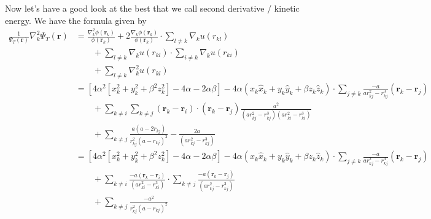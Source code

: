 \documentclass[%
oneside,                 %
final,                   %
10pt]{article}
\begin{document}
Now let's have a good look at the best that we call second derivative / kinetic energy. 
We have the formula given by
\begin{align*}
\frac{1}{\Psi_T(\mathbf{r})}\nabla_k^2\Psi_T(\mathbf{r}) &=
   \frac{\nabla_k^2\phi(\mathbf{r}_k)}{\phi(\mathbf{r}_k)}
   + 2\frac{\nabla_k\phi(\mathbf{r}_k)}{\phi(\mathbf{r}_k)}\cdot 
   \sum_{l\ne k}\nabla_k u(r_{kl})
   \\
   &\qquad
   + \sum_{l\ne k}\nabla_k u(r_{kl}) \cdot \sum_{i\ne k}\nabla_k u(r_{ki})
   \\
   &\qquad
   + \sum_{l\ne k}\nabla_k^2 u(r_{kl})
   \\
   &=\left[ 4\alpha^2\left[x_k^2+y_k^2+\beta^2z_k^2\right]-4\alpha-2\alpha\beta\right]-4\alpha(x_k \hat{x}_k+y_k \hat{y}_k+\beta z_k \hat{z}_k)\cdot \sum_{j\ne k}\frac{-a}{ar^2_{kj}-r^3_{kj}}{(\mathbf{r}_k-\mathbf{r}_j)}
   \\
   &\qquad + \sum_{k \ne i}\sum_{k \ne j}{(\mathbf{r}_k-\mathbf{r}_i)\cdot(\mathbf{r}_k-\mathbf{r}_j)}\frac{a^2}{(ar^2_{kj}-r^3_{kj})(ar^2_{ki}-r^3_{ki})}
   \\
   &\qquad + \sum_{k \ne j}\frac{a(a-2r_{kj})}{r_{kj}^2(a-r_{kj})^2}-\frac{2a}{(ar^2_{kj}-r^3_{kj})}\\
   &=\left[ 4\alpha^2\left[x_k^2+y_k^2+\beta^2z_k^2\right]-4\alpha-2\alpha\beta\right]-4\alpha(x_k \hat{x}_k+y_k \hat{y}_k+\beta z_k \hat{z}_k)\cdot \sum_{j\ne k}\frac{-a}{ar^2_{kj}-r^3_{kj}}{(\mathbf{r}_k-\mathbf{r}_j)}
   \\
   &\qquad + \sum_{k \ne i}\frac{-a(\mathbf{r}_k-\mathbf{r}_i)}{(ar^2_{ki}-r^3_{ki})}\cdot\sum_{k \ne j}\frac{-a{(\mathbf{r}_k-\mathbf{r}_j)}}{(ar^2_{kj}-r^3_{kj})}
   \\
   &\qquad + \sum_{k \ne j}\frac{-a^2}{r_{kj}^2(a-r_{kj})^2}
\end{align*}
 
\end{document}
